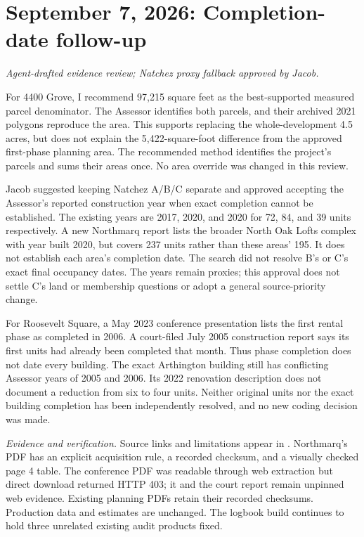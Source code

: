 \section*{September 7, 2026: Completion-date follow-up}
\textit{Agent-drafted evidence review; Natchez proxy fallback approved by Jacob.}

For 4400 Grove, I recommend 97,215 square feet as the best-supported measured
parcel denominator. The Assessor identifies both parcels, and their archived
2021 polygons reproduce the area. This supports replacing the whole-development
4.5 acres, but does not explain the 5,422-square-foot difference from the approved
first-phase planning area. The recommended method identifies the project's
parcels and sums their areas once. No area override was changed in this review.

Jacob suggested keeping Natchez A/B/C separate and approved accepting the
Assessor's reported construction year when exact completion cannot be established.
The existing years are 2017, 2020, and 2020 for 72, 84, and 39 units respectively.
A new Northmarq report lists the broader North Oak Lofts complex with year built
2020, but covers 237 units rather than these areas' 195. It does not establish
each area's completion date. The search did not resolve B's or C's exact final
occupancy dates. The years remain proxies; this approval does not settle C's
land or membership questions or adopt a general source-priority change.

For Roosevelt Square, a May 2023 conference presentation lists the first rental
phase as completed in 2006. A court-filed July 2005 construction report says its
first units had already been completed that month. Thus phase completion does
not date every building. The exact Arthington building still has conflicting
Assessor years of 2005 and 2006. Its 2022 renovation description does not document
a reduction from six to four units. Neither original units nor the exact building
completion has been independently resolved, and no new coding decision was made.

\small
\textit{Evidence and verification.} Source links and limitations appear in
. Northmarq's PDF has an explicit acquisition rule,
a recorded checksum, and a visually checked page 4 table. The conference PDF
was readable through web extraction but direct download returned HTTP 403; it
and the court report remain unpinned web evidence. Existing planning PDFs retain
their recorded checksums. Production data and estimates are unchanged. The
logbook build continues to hold three unrelated existing audit products fixed.
\normalsize
